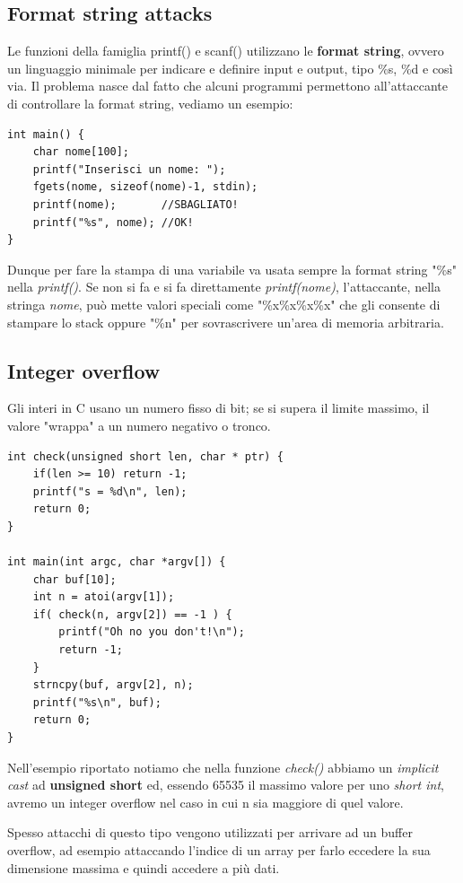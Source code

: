 \subsection{Format string attacks}

Le funzioni della famiglia printf() e scanf() utilizzano le \textbf{format string}, ovvero un
linguaggio minimale per indicare e definire input e output, tipo \%s, \%d e così via.
Il problema nasce dal fatto che alcuni programmi permettono all'attaccante 
di controllare la format string, vediamo un esempio:

\begin{lstlisting}
int main() {
    char nome[100];
    printf("Inserisci un nome: ");
    fgets(nome, sizeof(nome)-1, stdin);
    printf(nome);       //SBAGLIATO!
    printf("%s", nome); //OK!
}
\end{lstlisting}

Dunque per fare la stampa di una variabile va usata sempre la format string "\%s" nella \textit{printf()}. 
Se non si fa e si fa direttamente \textit{printf(nome)}, l'attaccante, nella stringa \textit{nome}, 
può mette valori speciali come "\%x\%x\%x\%x" che gli consente di stampare lo
stack oppure "\%n" per sovrascrivere un'area di memoria arbitraria.

\subsection{Integer overflow}

Gli interi in C usano un numero fisso di bit; se si supera il limite massimo, 
il valore "wrappa" a un numero negativo o tronco.

\begin{lstlisting}
int check(unsigned short len, char * ptr) {
    if(len >= 10) return -1;
    printf("s = %d\n", len);
    return 0;
}

int main(int argc, char *argv[]) {
    char buf[10];
    int n = atoi(argv[1]);
    if( check(n, argv[2]) == -1 ) {
        printf("Oh no you don't!\n");
        return -1;
    }
    strncpy(buf, argv[2], n);
    printf("%s\n", buf);
    return 0;
}
\end{lstlisting}

Nell'esempio riportato notiamo che nella funzione \textit{check()} abbiamo 
un \textit{implicit cast} ad \textbf{unsigned short} ed, essendo 65535 il massimo 
valore per uno \textit{short int}, avremo un integer overflow nel caso in cui n sia maggiore
di quel valore.

Spesso attacchi di questo tipo vengono utilizzati per arrivare ad un buffer
overflow, ad esempio attaccando l'indice di un array per farlo eccedere la sua
dimensione massima e quindi accedere a più dati.

